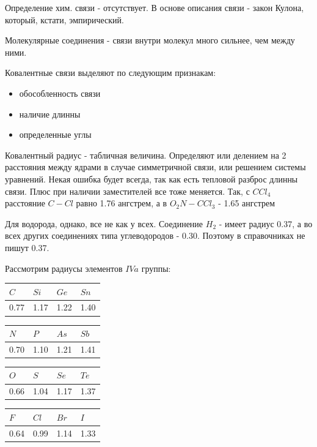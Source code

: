 \documentclass[11pt]{article}
\begin{document}
Определение хим. связи - отсутствует. В основе описания связи - закон Кулона, который, кстати, эмпирический.

Молекулярные соединения - связи внутри молекул много сильнее, чем между ними. 

Ковалентные связи выделяют по следующим признакам:
\begin{itemize}
\item обособленность связи

\item наличие длинны

\item определенные углы
\end{itemize}

Ковалентный радиус - табличная величина. Определяют или делением на 2 расстояния между ядрами в случае симметричной связи, или решением системы уравнений. Некая ошибка будет всегда, так как есть тепловой разброс длинны связи. Плюс при наличии заместителей все тоже меняется. Так, с $CCl_4$ расстояние $C-Cl$ равно 1.76 ангстрем, а в $O_2N-CCl_3$ - 1.65 ангстрем

Для водорода, однако, все не как у всех. Соединение $H_2$ - имеет радиус 0.37, а во всех других соединениях типа углеводородов - 0.30. Поэтому в справочниках не пишут 0.37.

Рассмотрим радиусы элементов $IVa$ группы:
\begin{center}
\begin{tabular}{|l|l|l|l|}
\hline
	$C$ & $Si$ & $Ge$ & $Sn$\\
\hline
	0.77 & 1.17 & 1.22 & 1.40\\
\hline
\end{tabular}

\begin{tabular}{|l|l|l|l|}
\hline
	$N$ & $P$ & $As$ & $Sb$\\
\hline
	0.70 & 1.10 & 1.21 & 1.41\\
\hline
\end{tabular}

\begin{tabular}{|l|l|l|l|}
\hline
	$O$ & $S$ & $Se$ & $Te$\\
\hline
	0.66 & 1.04 & 1.17 & 1.37\\
\hline
\end{tabular}

\begin{tabular}{|l|l|l|l|}
\hline
	$F$ & $Cl$ & $Br$ & $I$\\
\hline
	0.64 & 0.99 & 1.14 & 1.33\\
\hline
\end{tabular}
\end{center}
\end{document}
